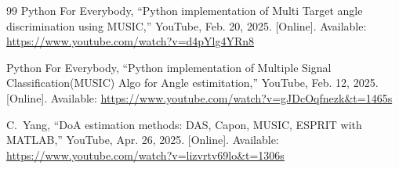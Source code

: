 \begin{thebibliography}{99}
	Python For Everybody, ``Python implementation of Multi Target angle discrimination using MUSIC,'' YouTube, Feb. 20, 2025.
	[Online]. Available: \url{https://www.youtube.com/watch?v=d4pYlg4YRn8}
	
	Python For Everybody, ``Python implementation of Multiple Signal Classification(MUSIC) Algo for Angle estimitation,'' YouTube, Feb. 12, 2025.
	[Online]. Available: \url{https://www.youtube.com/watch?v=gJDcOqfnezk&t=1465s}
	
	C.~Yang, ``DoA estimation methods: DAS, Capon, MUSIC, ESPRIT with MATLAB,'' YouTube, Apr. 26, 2025.
	[Online]. Available: \url{https://www.youtube.com/watch?v=lizvrtv69lo&t=1306s}
	
\end{thebibliography}
